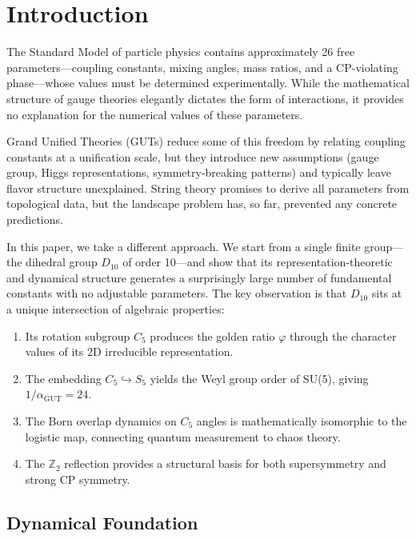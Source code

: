 \documentclass[11pt,a4paper]{article}
\begin{document}
\tableofcontents
\newpage

\section{Introduction}

The Standard Model of particle physics contains approximately 26 free parameters---coupling constants, mixing angles, mass ratios, and a CP-violating phase---whose values must be determined experimentally. While the mathematical structure of gauge theories elegantly dictates the form of interactions, it provides no explanation for the numerical values of these parameters.

Grand Unified Theories (GUTs) reduce some of this freedom by relating coupling constants at a unification scale, but they introduce new assumptions (gauge group, Higgs representations, symmetry-breaking patterns) and typically leave flavor structure unexplained. String theory promises to derive all parameters from topological data, but the landscape problem has, so far, prevented any concrete predictions.

In this paper, we take a different approach. We start from a single finite group---the dihedral group $D_{10}$ of order 10---and show that its representation-theoretic and dynamical structure generates a surprisingly large number of fundamental constants with no adjustable parameters. The key observation is that $D_{10}$ sits at a unique intersection of algebraic properties:
\begin{enumerate}
\item Its rotation subgroup $C_5$ produces the golden ratio $\varphi$ through the character values of its 2D irreducible representation.
\item The embedding $C_5 \hookrightarrow S_5$ yields the Weyl group order of SU(5), giving $1/\alpha_{\text{GUT}} = 24$.
\item The Born overlap dynamics on $C_5$ angles is mathematically isomorphic to the logistic map, connecting quantum measurement to chaos theory.
\item The $\mathbb{Z}_2$ reflection provides a structural basis for both supersymmetry and strong CP symmetry.
\end{enumerate}

\subsection*{Dynamical Foundation}
\end{document}
